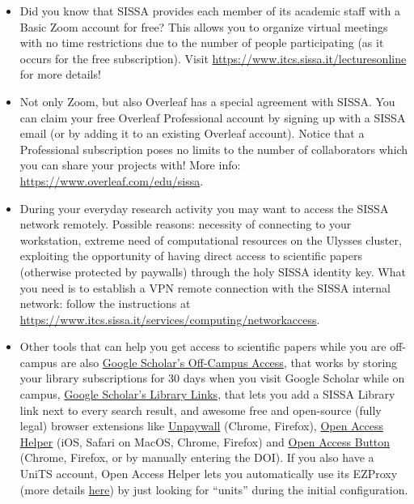 \documentclass{sissavademecum}
\begin{document}
\begin{itemize}
	\item Did you know that SISSA provides each member of its academic staff with a Basic Zoom account for free? This allows you to organize virtual meetings with no time restrictions due to the number of people participating (as it occurs for the free subscription). Visit \url{https://www.itcs.sissa.it/lecturesonline} for more details!
	
	\item Not only Zoom, but also Overleaf has a special agreement with SISSA. You can claim your free Overleaf Professional account by signing up with a SISSA email (or by adding it to an existing Overleaf account). Notice that a Professional subscription poses no limits to the number of collaborators which you can share your projects with! More info: \url{https://www.overleaf.com/edu/sissa}.
	
	\item During your everyday research activity you may want to access the SISSA network remotely. Possible reasons: necessity of connecting to your workstation, extreme need of computational resources on the Ulysses cluster, exploiting the opportunity of having direct access to scientific papers (otherwise protected by paywalls) through the holy SISSA identity key. What you need is to establish a VPN remote connection with the SISSA internal network: follow the instructions at \url{https://www.itcs.sissa.it/services/computing/networkaccess}.
	
	\item Other tools that can help you get access to scientific papers while you are off-campus are also \href{https://scholar.google.com/intl/en/scholar/help.html\#access}{Google Scholar's Off-Campus Access}, that works by storing your library subscriptions for 30 days when you visit Google Scholar while on campus, \href{https://scholar.google.com/scholar_settings?sciifh=1\&as_sdt=0,5\#2}{Google Scholar's Library Links}, that lets you add a SISSA Library link next to every search result, and awesome free and open-source (fully legal) browser extensions like \href{https://unpaywall.org}{Unpaywall} (Chrome, Firefox), \href{https://www.oahelper.org}{Open Access Helper} (iOS, Safari on MacOS, Chrome, Firefox) and \href{https://openaccessbutton.org}{Open Access Button} (Chrome, Firefox, or by manually entering the DOI). If you also have a UniTS account, Open Access Helper lets you automatically use its EZProxy (more details \href{https://www.oahelper.org/ezproxy/}{here}) by just looking for ``units'' during the initial configuration.
	

\end{itemize}
\end{document}
